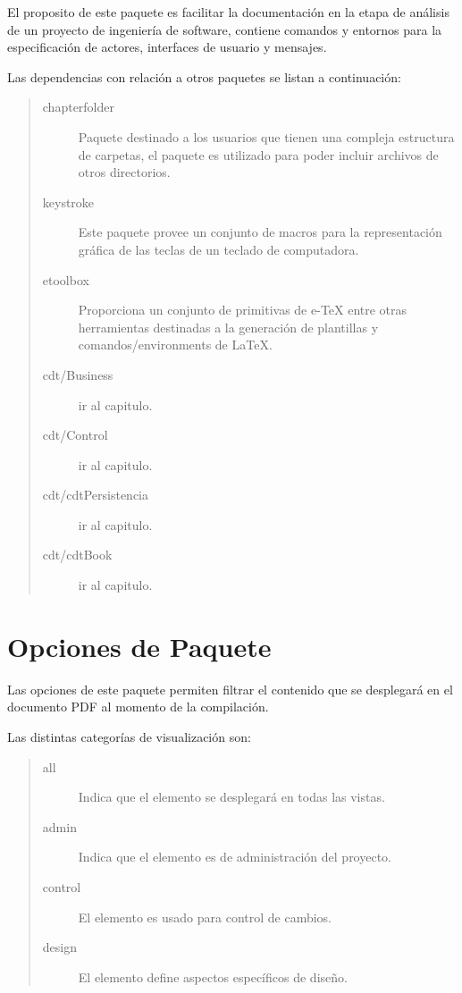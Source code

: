 \label{ch:analisis}

El proposito de este paquete es facilitar la documentación en la etapa de análisis de un proyecto de ingeniería de software, contiene comandos y entornos para la especificación de actores, interfaces de usuario y mensajes.

\noindent Las dependencias con relación a otros paquetes se listan a continuación:

    \begin{quote}
    \begin{description}
        \item[chapterfolder] Paquete destinado a los usuarios que tienen una compleja estructura de carpetas, el paquete es utilizado para poder incluir archivos de otros directorios.
        \item[keystroke] Este paquete provee un conjunto de macros para la representación gráfica de las teclas de un teclado de computadora.
        \item[etoolbox] Proporciona un conjunto de primitivas de e-TeX entre otras herramientas destinadas a la generación de plantillas y comandos/environments de \LaTeX.
        \item[cdt/Business] ir al capitulo.
        \item[cdt/Control] ir al capitulo.
        \item[cdt/cdtPersistencia] ir al capitulo.
        \item[cdt/cdtBook] ir al capitulo.
    \end{description}
    \end{quote}

\section{Opciones de Paquete}

Las opciones de este paquete permiten filtrar el contenido que se desplegará en el documento PDF al momento de la compilación.
    
\noindent Las distintas categorías de visualización son:

    \begin{quote}
    \begin{description}
        \item[all] Indica que el elemento se desplegará en todas las vistas.
        \item[admin] Indica que el elemento es de administración del proyecto.
        \item[control] El elemento es usado para control de cambios.
        \item[design] El elemento define aspectos específicos de diseño.
    \end{description}
    \end{quote}

